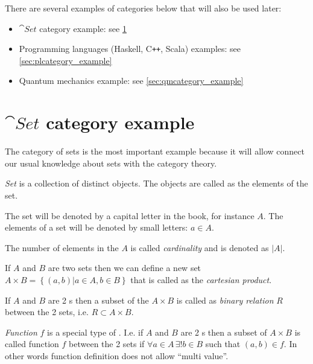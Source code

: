 There are several examples of categories below that will also be used
later:
\begin{itemize}
\item $\cat{Set}$ category example: see \cref{sec:setcategory_example}
\item Programming languages (Haskell, C\texttt{++}, Scala) examples: see
  \cref{sec:plcategory_example}
\item Quantum mechanics example: see \cref{sec:qmcategory_example}
\end{itemize}

\section{$\cat{Set}$ category example}
\label{sec:setcategory_example}
The category of sets is the most important example because it will
allow connect our usual knowledge about sets with the category theory. 

\begin{definition}[Set]
  \label{def:set}
  \textit{Set} is a collection of distinct objects. The objects are called as
  the elements of the set. 

  The set will be denoted by a capital letter in
  the book, for instance $A$. The elements of a set will be denoted by
  small letters: $a \in A$.
\end{definition}

\begin{definition}[Cardinality]
\label{def:cardinality}
The number of elements in the  $A$ is called
\textit{cardinality} and is denoted as $\left|A\right|$.
\end{definition}

\begin{definition}
  \label{def:cartesian_product}
  If $A$ and $B$ are two sets then we can define a new set $A \times B
  = \left\{(a,b)|a \in A, b \in B\right\}$ that is called as the
  \textit{cartesian product}.
\end{definition}

\begin{definition}
  \label{def:binary_relation}
  If $A$ and $B$ are 2 s then a subset of the
   $A \times B$ is
  called as \textit{binary relation} $R$ between the 2 sets, i.e. $R
  \subset A \times B$. 
\end{definition}

\begin{definition}[Function]
  \label{def:function}
  \textit{Function} $f$ is a special type of . I.e.
  if $A$ and $B$ are 2 s then a subset of $A \times B$ is
  called function $f$ between the 2 sets if $\forall a \in A \, \exists!
  b \in B$ such that $(a,b) \in f$. In other words function definition
  does not allow ``multi value''.
\end{definition}

